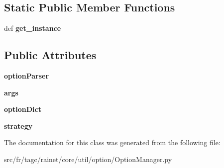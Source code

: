 \subsection*{Static Public Member Functions}
\begin{DoxyCompactItemize}
\item 
\hypertarget{classsrc_1_1fr_1_1tagc_1_1rainet_1_1core_1_1util_1_1option_1_1OptionManager_1_1OptionManager_ab91a5e9153bb003d21ad2f213e73bbc1}{def {\bfseries get\-\_\-instance}}\label{classsrc_1_1fr_1_1tagc_1_1rainet_1_1core_1_1util_1_1option_1_1OptionManager_1_1OptionManager_ab91a5e9153bb003d21ad2f213e73bbc1}

\end{DoxyCompactItemize}
\subsection*{Public Attributes}
\begin{DoxyCompactItemize}
\item 
\hypertarget{classsrc_1_1fr_1_1tagc_1_1rainet_1_1core_1_1util_1_1option_1_1OptionManager_1_1OptionManager_a1e68a676c587da9c7533a7f83b55ae6a}{{\bfseries option\-Parser}}\label{classsrc_1_1fr_1_1tagc_1_1rainet_1_1core_1_1util_1_1option_1_1OptionManager_1_1OptionManager_a1e68a676c587da9c7533a7f83b55ae6a}

\item 
\hypertarget{classsrc_1_1fr_1_1tagc_1_1rainet_1_1core_1_1util_1_1option_1_1OptionManager_1_1OptionManager_acad91217f064449ec5c4b73682968117}{{\bfseries args}}\label{classsrc_1_1fr_1_1tagc_1_1rainet_1_1core_1_1util_1_1option_1_1OptionManager_1_1OptionManager_acad91217f064449ec5c4b73682968117}

\item 
\hypertarget{classsrc_1_1fr_1_1tagc_1_1rainet_1_1core_1_1util_1_1option_1_1OptionManager_1_1OptionManager_a1c059b3e42150cfcf45234cd2cd97292}{{\bfseries option\-Dict}}\label{classsrc_1_1fr_1_1tagc_1_1rainet_1_1core_1_1util_1_1option_1_1OptionManager_1_1OptionManager_a1c059b3e42150cfcf45234cd2cd97292}

\item 
\hypertarget{classsrc_1_1fr_1_1tagc_1_1rainet_1_1core_1_1util_1_1option_1_1OptionManager_1_1OptionManager_a0cc455a590b33fe81687b2d0b0d8f5f3}{{\bfseries strategy}}\label{classsrc_1_1fr_1_1tagc_1_1rainet_1_1core_1_1util_1_1option_1_1OptionManager_1_1OptionManager_a0cc455a590b33fe81687b2d0b0d8f5f3}

\end{DoxyCompactItemize}


The documentation for this class was generated from the following file\-:\begin{DoxyCompactItemize}
\item 
src/fr/tagc/rainet/core/util/option/Option\-Manager.\-py\end{DoxyCompactItemize}
